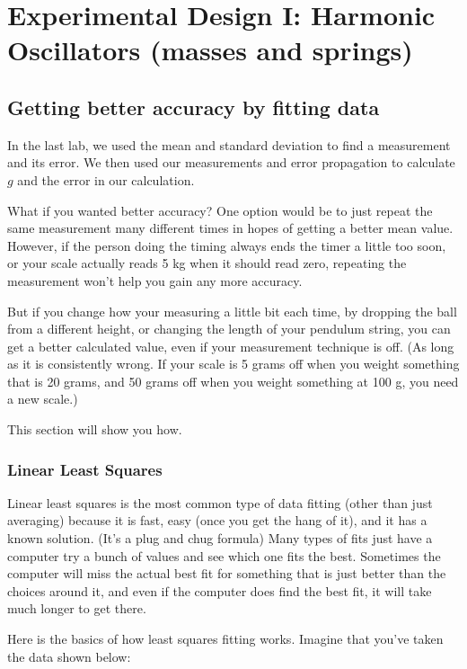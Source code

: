 \documentclass{book}
\begin{document}
\chapter[Experimental Design I]{Experimental Design I: Harmonic Oscillators (masses and springs)\label{Experimental Design}}
\section{Getting better accuracy by fitting data}
In the last lab, we used the mean and standard deviation to find a measurement and its error.  We then used our measurements and error propagation to calculate $g$ and the error in our calculation.

What if you wanted better accuracy?  One option would be to just repeat the same measurement many different times in hopes of getting a better mean value.  However, if the person doing the timing always ends the timer a little too soon, or your scale actually reads 5 kg when it should read zero, repeating the measurement won't help you gain any more accuracy.

But if you change how your measuring a little bit each time, by dropping the ball from a different height, or changing the length of your pendulum string, you can get a better calculated value, even if your measurement technique is off.  (As long as it is consistently wrong.  If your scale is 5 grams off when you weight something that is 20 grams, and 50 grams off when you weight something at 100 g, you need a new scale.)

This section will show you how.

\subsection{Linear Least Squares}

Linear least squares is the most common type of data fitting (other than just averaging) because it is fast, easy (once you get the hang of it), and it has a known solution. (It's a plug and chug formula)
Many types of fits just have a computer try a bunch of values and see which one fits the best.  Sometimes the computer will miss the actual best fit for something that is just better than the choices around it, and even if the computer does find the best fit, it will take much longer to get there.

Here is the basics of how least squares fitting works.  Imagine that you've taken the data shown below:
\end{document}
